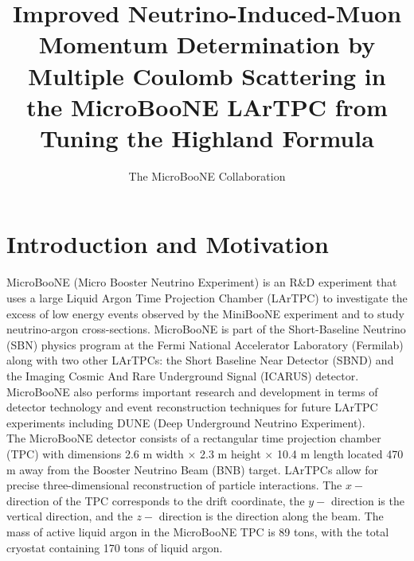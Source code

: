 \documentclass[a4paper,11pt]{article}
\author{The MicroBooNE Collaboration}
\title{Improved Neutrino-Induced-Muon Momentum Determination by Multiple Coulomb Scattering in the MicroBooNE LArTPC from Tuning the Highland Formula}
\begin{document}
\maketitle
\flushbottom

\section{Introduction and Motivation}\label{sec:intro}

MicroBooNE (Micro Booster Neutrino Experiment) is an R\&D experiment that uses a large Liquid Argon Time Projection Chamber (LArTPC) to investigate the excess of low energy events observed by the MiniBooNE experiment \cite{Aguilar-Arevalo:2013pmq} and to study neutrino-argon cross-sections. MicroBooNE is part of the Short-Baseline Neutrino (SBN) \cite{SBNwhitepaper} physics program at the Fermi National Accelerator Laboratory (Fermilab) along with two other LArTPCs: the Short Baseline Near Detector (SBND) and the Imaging Cosmic And Rare Underground Signal (ICARUS) detector. MicroBooNE also performs important research and development in terms of detector technology and event reconstruction techniques for future LArTPC experiments including DUNE (Deep Underground Neutrino Experiment).\\


The MicroBooNE detector \cite{ub_detectorpaper} consists of a rectangular time projection chamber (TPC) with dimensions 2.6 m width $\times$ 2.3 m height $\times$ 10.4 m length located 470 m away from the Booster Neutrino Beam (BNB) target. LArTPCs allow for precise three-dimensional reconstruction of particle interactions. The $x-$ direction of the TPC corresponds to the drift coordinate, the $y-$ direction is the vertical direction, and the $z-$ direction is the direction along the beam. The mass of active liquid argon in the MicroBooNE TPC is 89 tons, with the total cryostat containing 170 tons of liquid argon.\\
\end{document}
